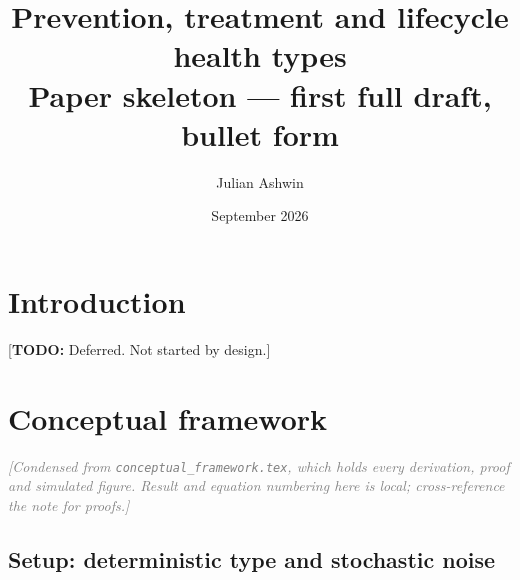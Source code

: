 \documentclass[11pt]{article}
\title{Prevention, treatment and lifecycle health types\\[4pt]
\large Paper skeleton --- first full draft, bullet form}
\author{Julian Ashwin \and \todo{co-authors}}
\date{September 2026}
\newcommand{\todo}[1]{\textcolor{red!75!black}{[\textbf{TODO:} #1]}}
\newcommand{\note}[1]{\textcolor{gray}{\textit{[#1]}}}
\newcommand{\code}[1]{\texttt{\small #1}}
\begin{document}
\maketitle


\section{Introduction}
\todo{Deferred. Not started by design.}

\section{Conceptual framework}
\label{sec:framework}
\note{Condensed from \code{conceptual\_framework.tex}, which holds every derivation, proof and simulated figure. Result and equation numbering here is local; cross-reference the note for proofs.}

\subsection{Setup: deterministic type and stochastic noise}
\end{document}

